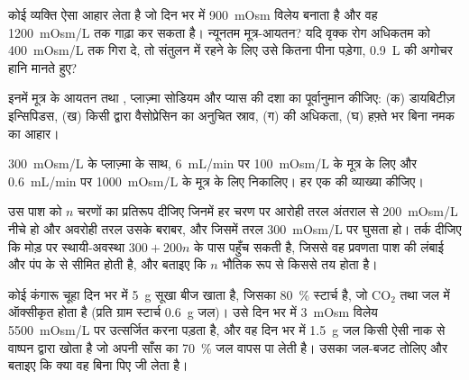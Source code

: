 \begin{exercise}[$\star\star$]\label{exo:b3:renal-osmoregulation:7}
कोई व्यक्ति ऐसा आहार लेता है जो दिन भर में \qty{900}{mOsm} विलेय बनाता
है और वह \qty{1200}{mOsm/L} तक गाढ़ा कर सकता है। न्यूनतम मूत्र-आयतन?
यदि वृक्क रोग अधिकतम को \qty{400}{mOsm/L} तक गिरा दे, तो संतुलन में
रहने के लिए उसे कितना पीना पड़ेगा, \qty{0.9}{L} की अगोचर हानि मानते हुए?
\end{exercise}

\begin{exercise}[$\star\star$]\label{exo:b3:renal-osmoregulation:8}
इनमें मूत्र के आयतन तथा , प्लाज़्मा सोडियम और प्यास की दशा
का पूर्वानुमान कीजिए: (क) डायबिटीज़ इन्सिपिडस, (ख) किसी  द्वारा
वैसोप्रेसिन का अनुचित स्राव, (ग)  की अधिकता, (घ) हफ़्ते भर
बिना नमक का आहार।
\end{exercise}

\begin{exercise}[$\star\star$]\label{exo:b3:renal-osmoregulation:9}
\qty{300}{mOsm/L} के प्लाज़्मा के साथ, \qty{6}{mL/min} पर
\qty{100}{mOsm/L} के मूत्र के लिए और \qty{0.6}{mL/min} पर
\qty{1000}{mOsm/L} के मूत्र के लिए  निकालिए। हर एक की
व्याख्या कीजिए।
\end{exercise}

\begin{exercise}[$\star\star\star$]\label{exo:b3:renal-osmoregulation:10}
उस पाश को $n$ चरणों का प्रतिरूप दीजिए जिनमें हर चरण पर आरोही तरल
अंतराल से \qty{200}{mOsm/L} नीचे हो और अवरोही तरल उसके बराबर, और जिसमें
तरल \qty{300}{mOsm/L} पर घुसता हो। तर्क दीजिए कि मोड़ पर
स्थायी-अवस्था  $300 +
200n$ के पास पहुँच सकती है, जिससे वह प्रवणता पाश की लंबाई और पंप के
 से सीमित होती है, और बताइए कि $n$ भौतिक रूप से किससे तय होता
है।
\end{exercise}

\begin{exercise}[$\star\star\star$]\label{exo:b3:renal-osmoregulation:11}
कोई कंगारू चूहा दिन भर में \qty{5}{g} सूखा बीज खाता है, जिसका
\qty{80}{\%} स्टार्च है, जो CO$_{2}$ तथा जल में ऑक्सीकृत होता है (प्रति
ग्राम स्टार्च \qty{0.6}{g} जल)। उसे दिन भर में \qty{3}{mOsm} विलेय
\qty{5500}{mOsm/L} पर उत्सर्जित करना पड़ता है, और वह दिन भर में
\qty{1.5}{g} जल किसी ऐसी नाक से वाष्पन द्वारा खोता है जो अपनी साँस का
\qty{70}{\%} जल वापस पा लेती है। उसका जल-बजट तोलिए और बताइए कि क्या वह
बिना पिए जी लेता है।
\end{exercise}

